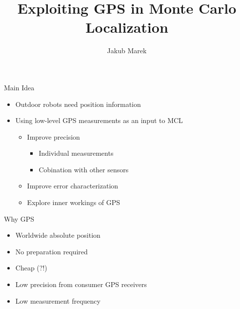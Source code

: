 \documentclass[utf8]{beamer}
\title{Exploiting GPS in Monte Carlo Localization}
\author{Jakub Marek}
\newcommand{\imageframe}[2]{{
\setbeamertemplate{background}{
    \vbox to \paperheight{\vfil\hbox to \paperwidth{\hfil
    \texttt{[image: \#1]} %
    \hfil}\vfil}
    }
\setbeamercolor{background canvas}{bg=#2}
\begin{frame}[plain]
\end{frame}
}}
\begin{document}
\begin{frame}[plain]
    \titlepage
\end{frame}

\begin{frame}{Main Idea}
    \begin{itemize}
        \item Outdoor robots need position information
        \item Using low-level GPS measurements as an input to MCL
        \begin{itemize}
            \item Improve precision
            \begin{itemize}
                \item Individual measurements
                \item Cobination with other sensors
            \end{itemize}
            \item Improve error characterization
            \item Explore inner workings of GPS
        \end{itemize}
    \end{itemize}
\end{frame}


\begin{frame}{Why GPS}
    \begin{itemize}
        \item Worldwide absolute position
        \item No preparation required
        \item Cheap (?!)
    \end{itemize}

    \begin{itemize}
        \item Low precision from consumer GPS receivers
        \item Low measurement frequency
    \end{itemize}
\end{frame}
\end{document}
